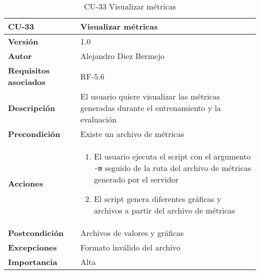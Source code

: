 \begin{table}[p]
	\centering
	\begin{tabularx}{\linewidth}{ p{} p{} }
		\toprule
		\textbf{CU-33}    & \textbf{Visualizar métricas}\\
		\toprule
		\textbf{Versión}              & 1.0    \\
		\textbf{Autor}                & Alejandro Diez Bermejo \\
		\textbf{Requisitos asociados} & RF-5.6 \\
		\textbf{Descripción}          & El usuario quiere visualizar las métricas generadas durante el entrenamiento y la evaluación \\
        \textbf{Precondición}         & Existe un archivo de métricas \\
		\textbf{Acciones}             &
		\begin{enumerate}
			\def\labelenumi{\arabic{enumi}.}
			\tightlist
            \item El usuario ejecuta el script con el argumento \texttt{-m} seguido de la ruta del archivo de métricas generado por el servidor
            \item El script genera diferentes gráficas y archivos a partir del archivo de métricas
		\end{enumerate}\\
		\textbf{Postcondición}        & Archivos de valores y gráficas \\
		\textbf{Excepciones}          & Formato inválido del archivo \\
		\textbf{Importancia}          & Alta \\
		\bottomrule
	\end{tabularx}
	\caption{CU-33 Visualizar métricas}
\end{table}
